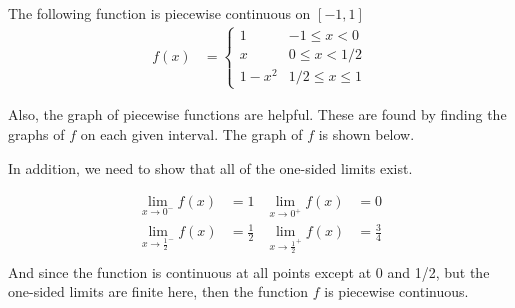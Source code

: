 \begin{example} \label{ex:piecewise:cont:function}
The following function is piecewise continuous on $[-1,1]$
% 
\begin{align*}
f(x) & = \begin{cases}
1 & -1 \leq x < 0 \\
x & 0 \leq x < 1/2 \\
1-x^2 & 1/2 \leq x \leq 1
\end{cases}
\end{align*}

Also, the graph of piecewise functions are helpful.  These are found by finding the graphs of $f$ on each given interval. The graph of $f$ is shown below. 

\begin{center}
\end{center}

In addition, we need to show that all of the one-sided limits exist.  

\begin{align*}
\lim_{x \rightarrow 0^-} f(x) & = 1 & \lim_{x \rightarrow 0^+} f(x) & = 0 \\
\lim_{x \rightarrow \frac{1}{2}^-} f(x) & = \frac{1}{2} & \lim_{x \rightarrow \frac{1}{2}^+} f(x) & = \frac{3}{4} \\
\end{align*}
%
And since the function is continuous at all points except at 0 and 1/2, but the one-sided limits are finite here, then the function $f$ is piecewise continuous.  

\end{example}

\phantom{hi}

